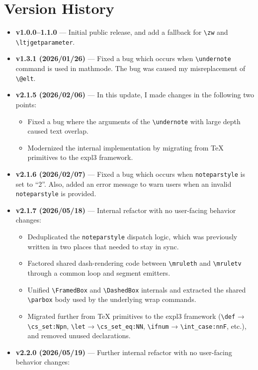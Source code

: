 \documentclass[luatex,fontsize=8pt,paper=b5,twoside]{jlreq}%
\begin{document}
\section{Version History}
\begin{itemize}
  \item \textbf{v1.0.0--1.1.0} --- Initial public release, and add a fallback for \verb|\zw| and \verb|\ltjgetparameter|.
  \item \textbf{v1.3.1 (2026/01/26)} --- Fixed a bug which occurs when \verb|\undernote| command is used in mathmode. The bug was caused my misreplacement of \verb|\@elt|.
  \item \textbf{v2.1.5 (2026/02/06)} --- In this update, I made changes in the following two points:
    \begin{itemize}
      \item Fixed a bug where the arguments of the \verb|\undernote| with large depth caused text overlap. 
      \item Modernized the internal implementation by migrating from TeX primitives to the expl3 framework.
    \end{itemize}
  \item \textbf{v2.1.6 (2026/02/07)} --- Fixed a bug which occurs when \verb|noteparstyle| is set to ``2''. Also, added an error message to warn users when an invalid \verb|noteparstyle| is provided.
  \item \textbf{v2.1.7 (2026/05/18)} --- Internal refactor with no user-facing behavior changes:
    \begin{itemize}
      \item Deduplicated the \verb|noteparstyle| dispatch logic, which was previously written in two places that needed to stay in sync.
      \item Factored shared dash-rendering code between \verb|\mruleth| and \verb|\mruletv| through a common loop and segment emitters.
      \item Unified \verb|\FramedBox| and \verb|\DashedBox| internals and extracted the shared \verb|\parbox| body used by the underlying wrap commands.
      \item Migrated further from TeX primitives to the expl3 framework (\verb|\def| → \verb|\cs_set:Npn|, \verb|\let| → \verb|\cs_set_eq:NN|, \verb|\ifnum| → \verb|\int_case:nnF|, etc.), and removed unused declarations.
    \end{itemize}
  \item \textbf{v2.2.0 (2026/05/19)} --- Further internal refactor with no user-facing behavior changes:

\end{itemize}
\end{document}
